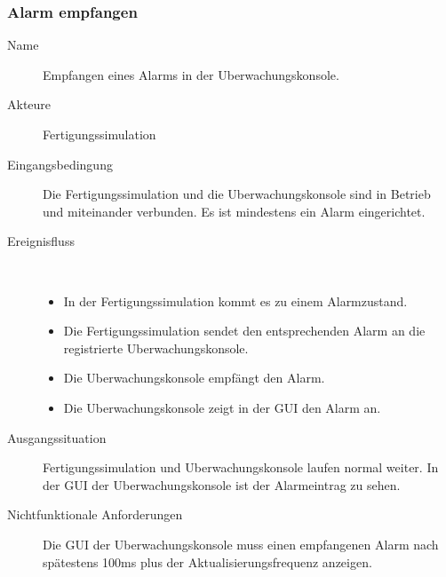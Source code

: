 \documentclass[parskip=full]{scrartcl}
\begin{document}
\subsubsection{Alarm empfangen}
\begin{description}
  \item[Name] Empfangen eines Alarms in der \gls{Uberwachungskonsole}.
  \item[Akteure] \gls{Fertigungssimulation}
  \item[Eingangsbedingung] Die \gls{Fertigungssimulation} und die \gls{Uberwachungskonsole} sind in Betrieb und miteinander verbunden.
    Es ist mindestens ein Alarm eingerichtet.
  \item[Ereignisfluss]~\\
  \begin{itemize}[noitemsep]
    \item In der \gls{Fertigungssimulation} kommt es zu einem Alarmzustand.
    \item Die \gls{Fertigungssimulation} sendet den entsprechenden Alarm an die registrierte \gls{Uberwachungskonsole}.
    \item Die \gls{Uberwachungskonsole} empf\"angt den Alarm.
    \item Die \gls{Uberwachungskonsole} zeigt in der \gls{GUI} den Alarm an.
  \end{itemize}
  \item[Ausgangssituation] \gls{Fertigungssimulation} und \gls{Uberwachungskonsole} laufen normal weiter. In der \gls{GUI} der
    \gls{Uberwachungskonsole} ist der Alarmeintrag zu sehen.
  \item [Nichtfunktionale Anforderungen] Die \gls{GUI} der \gls{Uberwachungskonsole} muss einen empfangenen Alarm nach sp\"atestens
    100ms plus der Aktualisierungsfrequenz anzeigen.
\end{description}
\end{document}

